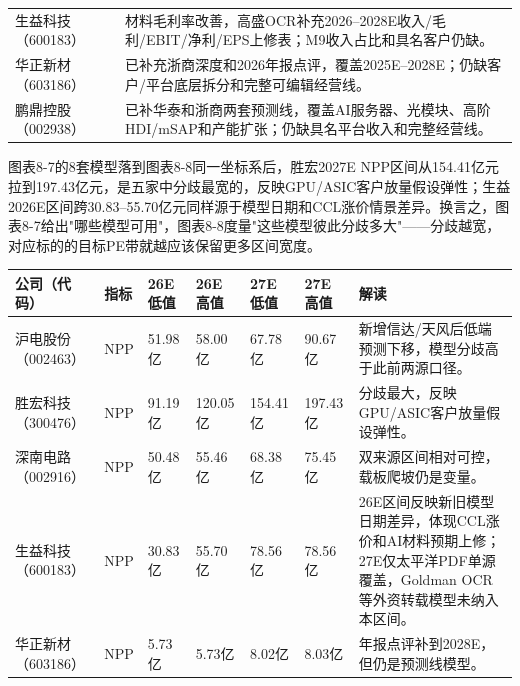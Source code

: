 \begin{exhibitbox}[图表8-7：已归档PDF中抽取的券商模型预测]
\begin{tabularx}{\textwidth}{L{1.8cm}X}
生益科技（600183） & 材料毛利率改善，高盛OCR补充2026--2028E收入/毛利/EBIT/净利/EPS上修表；M9收入占比和具名客户仍缺。 \\
华正新材（603186） & 已补充浙商深度和2026年报点评，覆盖2025E--2028E；仍缺客户/平台底层拆分和完整可编辑经营线。 \\
鹏鼎控股（002938） & 已补华泰和浙商两套预测线，覆盖AI服务器、光模块、高阶HDI/mSAP和产能扩张；仍缺具名平台收入和完整经营线。 \\
\bottomrule
\end{tabularx}
\end{exhibitbox}

图表8-7的8套模型落到图表8-8同一坐标系后，胜宏2027E NPP区间从154.41亿元拉到197.43亿元，是五家中分歧最宽的，反映GPU/ASIC客户放量假设弹性；生益2026E区间跨30.83--55.70亿元同样源于模型日期和CCL涨价情景差异。换言之，图表8-7给出"哪些模型可用"，图表8-8度量"这些模型彼此分歧多大"——分歧越宽，对应标的的目标PE带就越应该保留更多区间宽度。

\begin{exhibitbox}[图表8-8：多来源盈利预测区间]
\footnotesize
\begin{tabularx}{\textwidth}{L{1.8cm}L{1.8cm}R{1.8cm}R{1.8cm}R{1.8cm}R{1.8cm}X}
\toprule
\textbf{公司（代码）} & \textbf{指标} & \textbf{26E低值} & \textbf{26E高值} & \textbf{27E低值} & \textbf{27E高值} & \textbf{解读} \\
\midrule
沪电股份（002463） & NPP & 51.98亿 & 58.00亿 & 67.78亿 & 90.67亿 & 新增信达/天风后低端预测下移，模型分歧高于此前两源口径。 \\
胜宏科技（300476） & NPP & 91.19亿 & 120.05亿 & 154.41亿 & 197.43亿 & 分歧最大，反映GPU/ASIC客户放量假设弹性。 \\
深南电路（002916） & NPP & 50.48亿 & 55.46亿 & 68.38亿 & 75.45亿 & 双来源区间相对可控，载板爬坡仍是变量。 \\
生益科技（600183） & NPP & 30.83亿 & 55.70亿 & 78.56亿 & 78.56亿 & 26E区间反映新旧模型日期差异，体现CCL涨价和AI材料预期上修；27E仅太平洋PDF单源覆盖，Goldman OCR等外资转载模型未纳入本区间。 \\
华正新材（603186） & NPP & 5.73亿 & 5.73亿 & 8.02亿 & 8.03亿 & 年报点评补到2028E，但仍是预测线模型。 \\
\bottomrule
\end{tabularx}
\end{exhibitbox}

